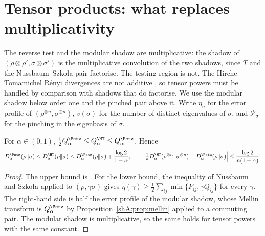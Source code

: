 \section{Tensor products: what replaces multiplicativity}\label{shA:sec:tensor}

The reverse test and the modular shadow are multiplicative: the shadow of $(\rho\otimes\rho',\sigma\otimes\sigma')$ is the multiplicative convolution of the two shadows, since $T$ and the Nussbaum--Szko{\l}a pair factorise. The testing region is not. The Hirche--Tomamichel R\'enyi divergences are not additive \cite{HircheTomamichel2024}, so tensor powers must be handled by comparison with shadows that do factorise. We use the modular shadow below order one and the pinched pair above it. Write $\eta_n$ for the error profile of $(\rho^{\otimes n},\sigma^{\otimes n})$, $v(\sigma)$ for the number of distinct eigenvalues of $\sigma$, and $\mathcal P_\sigma$ for the pinching in the eigenbasis of $\sigma$.


\begin{proposition}\label{shA:prop:petz}
For $\alpha\in(0,1)$, $\frac12Q^\Petz_\alpha\le Q^\HT_\alpha\le Q^\Petz_\alpha$. Hence
\[
D^\Petz_\alpha(\rho\|\sigma)\le D^\HT_\alpha(\rho\|\sigma)\le D^\Petz_\alpha(\rho\|\sigma)+\frac{\log2}{1-\alpha},\qquad \Big|\tfrac1nD^\HT_\alpha(\rho^{\otimes n}\|\sigma^{\otimes n})-D^\Petz_\alpha(\rho\|\sigma)\Big|\le\frac{\log2}{n(1-\alpha)} .
\]
\end{proposition}

\begin{proof}
The upper bound is \cite[(1.10)]{BeigiHircheTomamichel2025}. For the lower bound, the inequality of Nussbaum and Szko{\l}a \cite{NussbaumSzkola2009} applied to $(\rho,\gamma\sigma)$ gives $\eta(\gamma)\ge\frac12\sum_{ij}\min\{P_{ij},\gamma Q_{ij}\}$ for every $\gamma$. The right-hand side is half the error profile of the modular shadow, whose Mellin transform is $Q^\Petz_\alpha$ by Proposition~\ref{shA:prop:mellin} applied to a commuting pair. The modular shadow is multiplicative, so the same holds for tensor powers with the same constant.
\end{proof}


